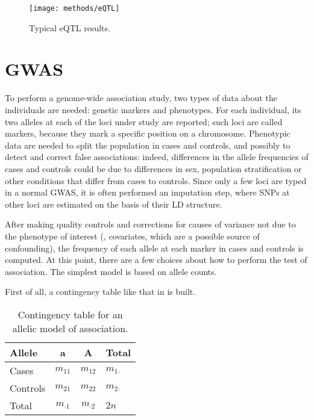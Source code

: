 \documentclass[../main.tex]{subfiles}
\begin{document}
\begin{figure}
	\centering
	\texttt{[image: methods/eQTL]}
	\caption{Typical eQTL results.}
\end{figure}

\section{GWAS}

To perform a genome-wide association study\autocite{Clarke2011}, two 
types of data about the individuals are needed: genetic markers and 
phenotypes. For each individual, its two alleles at each of the loci 
under study are reported; such loci are called markers, because they 
mark a specific position on a chromosome. Phenotypic data are needed to 
split the population in cases and controls, and possibly to detect and 
correct false associations: indeed, differences in the allele 
frequencies of cases and controls could be due to differences in sex, 
population stratification or other conditions that differ from cases to 
controls. Since only a few loci are typed in a normal GWAS, it is often 
performed an imputation step, where SNPs at other loci are estimated on 
the basis of their LD structure.

After making quality controls and corrections for causes of variance not 
due to the phenotype of interest (\ie, covariates, which are a possible 
source of confounding), the frequency of each allele at each marker in 
cases and controls is computed. At this point, there are a few choices 
about how to perform the test of association. The simplest model is 
based on allele counts.

First of all, a contingency table like that in  
is built.

\begin{table}
	\centering
	\begin{tabular}{ l c c l}
		\toprule
		Allele & a & A & Total \\
		\midrule
		Cases & $m_{11}$ & $m_{12}$ & $m_{1\cdot}$ \\
		Controls & $m_{21}$ & $m_{22}$ & $m_{2\cdot}$ \\
		Total & $m_{\cdot1}$ & $m_{\cdot2}$ & $2n$ \\
		\bottomrule
	\end{tabular}
	\caption{Contingency table for an allelic model of association.}
\end{table}
\end{document}
